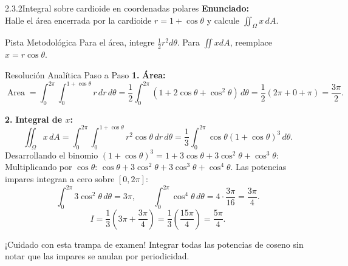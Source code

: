 \documentclass[11pt,a4paper]{article}
\begin{document}
\begin{nivelbox}{2.3.2}{Integral sobre cardioide en coordenadas polares}
\textbf{Enunciado:}\\
Halle el área encerrada por la cardioide $r = 1 + \cos\theta$ y calcule $\iint_\Omega x \, dA$.

\begin{observacionbox}{Pista Metodológica}
Para el área, integre $\frac{1}{2} r^2 d\theta$. Para $\iint x dA$, reemplace $x = r\cos\theta$.
\end{observacionbox}

\begin{ejerciciobox}{Resolución Analítica Paso a Paso}
\smallskip\noindent\textbf{1.} \textbf{Área:}
\[\operatorname{Area} = \int_0^{2\pi} \int_0^{1+\cos\theta} r \, dr \, d\theta = \frac{1}{2} \int_0^{2\pi} (1 + 2\cos\theta + \cos^2\theta) \, d\theta = \frac{1}{2} (2\pi + 0 + \pi) = \frac{3\pi}{2}.\]

\smallskip\noindent\textbf{2.} \textbf{Integral de $x$:}
\[\iint_\Omega x \, dA = \int_0^{2\pi} \int_0^{1+\cos\theta} r^2 \cos\theta \, dr \, d\theta = \frac{1}{3} \int_0^{2\pi} \cos\theta (1 + \cos\theta)^3 \, d\theta.\]
Desarrollando el binomio $(1 + \cos\theta)^3 = 1 + 3\cos\theta + 3\cos^2\theta + \cos^3\theta$:
Multiplicando por $\cos\theta$: $\cos\theta + 3\cos^2\theta + 3\cos^3\theta + \cos^4\theta$.
Las potencias impares integran a cero sobre $[0, 2\pi]$:
\[\int_0^{2\pi} 3\cos^2\theta \, d\theta = 3\pi, \qquad \int_0^{2\pi} \cos^4\theta \, d\theta = 4 \cdot \frac{3\pi}{16} = \frac{3\pi}{4}.\]
\[I = \frac{1}{3} \left( 3\pi + \frac{3\pi}{4} \right) = \frac{1}{3} \left( \frac{15\pi}{4} \right) = \frac{5\pi}{4}.\]
\end{ejerciciobox}

\begin{errorbox}{¡Cuidado con esta trampa de examen!}
Integrar todas las potencias de coseno sin notar que las impares se anulan por periodicidad.
\end{errorbox}
\end{nivelbox}
\bigskip
\end{document}
